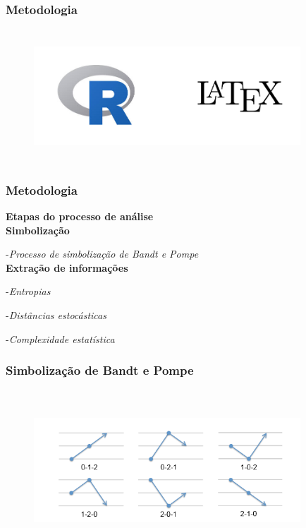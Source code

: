 \documentclass[10pt, compress]{beamer}
\begin{document}
\begin{frame}[fragile]
\frametitle{Metodologia}

\begin{figure}
  \centering
   \includegraphics[width=10cm,height=5cm]{ferramentas.png}
\end{figure}

\end{frame}


\begin{frame}[fragile]
\frametitle{Metodologia}
 
\textbf{\Large Etapas do processo de análise}\\

\textbf{Simbolização}

-\textit{Processo de simbolização de Bandt e Pompe}\\

\textbf{Extração de informações}

-\textit{Entropias} 

-\textit{Distâncias estocásticas}

-\textit{Complexidade estatística} 

\end{frame}

\begin{frame}[fragile]
\frametitle{Simbolização de Bandt e Pompe}

\begin{figure}
  \centering
   \includegraphics[width=10cm,height=6cm]{p.png}
\end{figure}
\end{frame}
\end{document}
